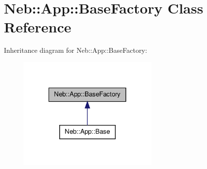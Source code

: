 \hypertarget{classNeb_1_1App_1_1BaseFactory}{\section{\-Neb\-:\-:\-App\-:\-:\-Base\-Factory \-Class \-Reference}
\label{classNeb_1_1App_1_1BaseFactory}
}


\-Inheritance diagram for \-Neb\-:\-:\-App\-:\-:\-Base\-Factory\-:\nopagebreak
\begin{figure}[H]
\begin{center}
\leavevmode
\includegraphics[width=198pt]{classNeb_1_1App_1_1BaseFactory__inherit__graph}
\end{center}
\end{figure}
